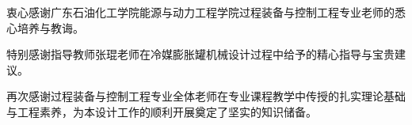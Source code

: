 
\begin{acknowledgements}
  衷心感谢广东石油化工学院能源与动力工程学院过程装备与控制工程专业老师的悉心培养与教诲。

  特别感谢指导教师张琨老师在冷媒膨胀罐机械设计过程中给予的精心指导与宝贵建议。

  再次感谢过程装备与控制工程专业全体老师在专业课程教学中传授的扎实理论基础与工程素养，为本设计工作的顺利开展奠定了坚实的知识储备。

\end{acknowledgements}

